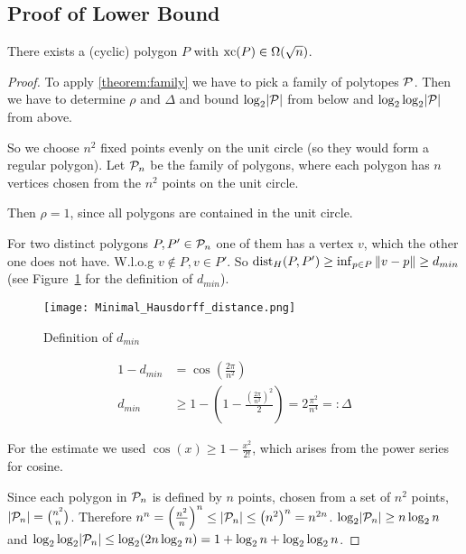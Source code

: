 \subsection{Proof of Lower Bound}

\begin{corollary}\label{corollary:lower-bound}
  There exists a (cyclic) polygon $P$ with $\xc(P) \in \Omega(\sqrt{n})$.
\end{corollary}
\begin{proof}
  To apply \ref{theorem:family} we have to pick a family of polytopes $\P$. Then we have to determine $\rho$ and $\Delta$ and bound $\log_2 \abs{\P}$ from below and $\log_2 \log_2 \abs{\P}$ from above.

  So we choose $n^2$ fixed points evenly on the unit circle (so they would form a regular polygon). Let $\P_n$ be the family of polygons, where each polygon has $n$ vertices chosen from the $n^2$ points on the unit circle.

  Then $\rho = 1$, since all polygons are contained in the unit circle.

  For two distinct polygons $P, P' \in \P_n$ one of them has a vertex $v$, which the other one does not have. W.l.o.g $v \notin P, v \in P'$. So $\dist_H(P,P') \geq \inf_{p \in P} \norm{v-p} \geq d_{min}$ (see Figure~\ref{fig:distance} for the definition of $d_{min}$).

  \begin{figure}[ht]
    \centering
    \texttt{[image: Minimal\_Hausdorff\_distance.png]}
    \caption{Definition of $d_{min}$}
    \label{fig:distance}
  \end{figure}

  \begin{align*}
    1 - d_{min} &= \cos\left( \frac{2 \pi}{n^2} \right)\\
    d_{min} &\geq 1 - \left(1 - \frac{\left(\frac{2 \pi}{n^2}\right)^2}{2} \right) = 2 \frac{\pi^2}{n^4} =: \Delta
  \end{align*}

  For the estimate we used $\cos(x) \geq 1 - \frac{x^2}{2!}$, which arises from the power series for cosine.

  Since each polygon in $\P_n$ is defined by $n$ points, chosen from a set of $n^2$ points, $\abs{\P_n} = \binom{n^2}{n}$. Therefore $n^n = \left( \frac{n^2}{n} \right)^n \leq \abs{\P_n} \leq \left( n^2 \right)^n = n^{2n}$. $\log_2 \abs{\P_n} \geq n \log_2 n$ and $\log_2 \log_2 \abs{\P_n} \leq \log_2 (2n \log_2 n) = 1 + \log_2 n + \log_2 \log_2 n$.


\end{proof}

